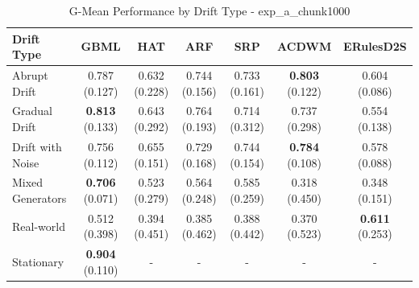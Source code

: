 \begin{table}[htbp]
\centering
\caption{G-Mean Performance by Drift Type - exp_a_chunk1000}
\label{tab:gmean_by_drift_exp_a_chunk1000}
\footnotesize
\begin{tabular}{lcccccc}
\toprule
Drift Type & GBML & HAT & ARF & SRP & ACDWM & ERulesD2S \\
\midrule
Abrupt Drift & 0.787 (0.127) & 0.632 (0.228) & 0.744 (0.156) & 0.733 (0.161) & \textbf{0.803} (0.122) & 0.604 (0.086) \\
Gradual Drift & \textbf{0.813} (0.133) & 0.643 (0.292) & 0.764 (0.193) & 0.714 (0.312) & 0.737 (0.298) & 0.554 (0.138) \\
Drift with Noise & 0.756 (0.112) & 0.655 (0.151) & 0.729 (0.168) & 0.744 (0.154) & \textbf{0.784} (0.108) & 0.578 (0.088) \\
Mixed Generators & \textbf{0.706} (0.071) & 0.523 (0.279) & 0.564 (0.248) & 0.585 (0.259) & 0.318 (0.450) & 0.348 (0.151) \\
Real-world & 0.512 (0.398) & 0.394 (0.451) & 0.385 (0.462) & 0.388 (0.442) & 0.370 (0.523) & \textbf{0.611} (0.253) \\
Stationary & \textbf{0.904} (0.110) & - & - & - & - & - \\
\bottomrule
\end{tabular}
\end{table}